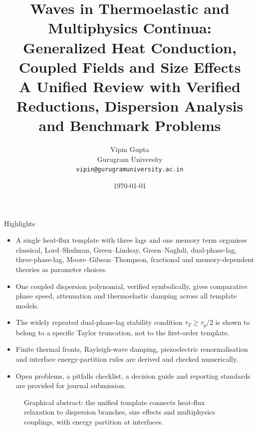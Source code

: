 \documentclass[12pt,a4paper]{article}
\title{\bfseries Waves in Thermoelastic and Multiphysics Continua:\\
 Generalized Heat Conduction, Coupled Fields and Size Effects\\[2pt]
\large A Unified Review with Verified Reductions, Dispersion Analysis and Benchmark Problems}
\author{Vipin Gupta\\{\small Gurugram University}\\{\small\texttt{vipin@gurugramuniversity.ac.in}}}
\date{\today}
\begin{document}
\maketitle

\begin{summarybox}{Highlights}
\begin{itemize}[nosep]
\item A single heat-flux template with three lags and one memory term organises classical, Lord--Shulman, Green--Lindsay, Green--Naghdi, dual-phase-lag, three-phase-lag, Moore--Gibson--Thompson, fractional and memory-dependent theories as parameter choices.
\item One coupled dispersion polynomial, verified symbolically, gives comparative phase speed, attenuation and thermoelastic damping across all template models.
\item The widely repeated dual-phase-lag stability condition $\tau_T\ge\tau_q/2$ is shown to belong to a specific Taylor truncation, not to the first-order template.
\item Finite thermal fronts, Rayleigh-wave damping, piezoelectric renormalisation and interface energy-partition rules are derived and checked numerically.
\item Open problems, a pitfalls checklist, a decision guide and reporting standards are provided for journal submission.
\end{itemize}
\end{summarybox}

\begin{figure}[t!]
\centering
{}
\caption{Graphical abstract: the unified template connects heat-flux relaxation to dispersion branches, size effects and multiphysics couplings, with energy partition at interfaces.}\label{fig:graphical}
\end{figure}
\end{document}
